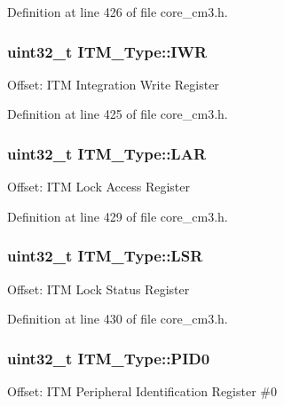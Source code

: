 Definition at line 426 of file core\+\_\+cm3.\+h.

\subsubsection[{\texorpdfstring{I\+WR}{IWR}}]{ {\bf uint32\+\_\+t} I\+T\+M\+\_\+\+Type\+::\+I\+WR}\hypertarget{struct_i_t_m___type_af53499fc94cda629afb2fec858d2ad1c}{}\label{struct_i_t_m___type_af53499fc94cda629afb2fec858d2ad1c}
Offset\+: I\+TM Integration Write Register 

Definition at line 425 of file core\+\_\+cm3.\+h.

\subsubsection[{\texorpdfstring{L\+AR}{LAR}}]{ {\bf uint32\+\_\+t} I\+T\+M\+\_\+\+Type\+::\+L\+AR}\hypertarget{struct_i_t_m___type_a33025af19748bd3ca5cf9d6b14150001}{}\label{struct_i_t_m___type_a33025af19748bd3ca5cf9d6b14150001}
Offset\+: I\+TM Lock Access Register 

Definition at line 429 of file core\+\_\+cm3.\+h.

\subsubsection[{\texorpdfstring{L\+SR}{LSR}}]{ {\bf uint32\+\_\+t} I\+T\+M\+\_\+\+Type\+::\+L\+SR}\hypertarget{struct_i_t_m___type_a56f607260c4175c5f37a28e47ab3d1e5}{}\label{struct_i_t_m___type_a56f607260c4175c5f37a28e47ab3d1e5}
Offset\+: I\+TM Lock Status Register 

Definition at line 430 of file core\+\_\+cm3.\+h.

\subsubsection[{\texorpdfstring{P\+I\+D0}{PID0}}]{ {\bf uint32\+\_\+t} I\+T\+M\+\_\+\+Type\+::\+P\+I\+D0}\hypertarget{struct_i_t_m___type_ab69ade751350a7758affdfe396517535}{}\label{struct_i_t_m___type_ab69ade751350a7758affdfe396517535}
Offset\+: I\+TM Peripheral Identification Register \#0 

